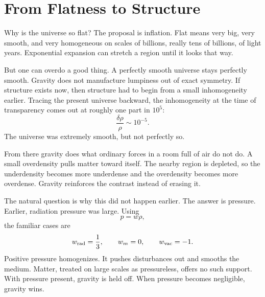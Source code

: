 \begin{classroomqa}
\end{classroomqa}

\begin{classroomqa}
\end{classroomqa}

\section{From Flatness to Structure}

Why is the universe so flat? The proposal is inflation. Flat means very big, very smooth, and very homogeneous on scales of billions, really tens of billions, of light years. Exponential expansion can stretch a region until it looks that way.

But one can overdo a good thing. A perfectly smooth universe stays perfectly smooth. Gravity does not manufacture lumpiness out of exact symmetry. If structure exists now, then structure had to begin from a small inhomogeneity earlier. Tracing the present universe backward, the inhomogeneity at the time of transparency comes out at roughly one part in \(10^5\):
\begin{equation}
\frac{\delta\rho}{\rho}\sim 10^{-5}.
\end{equation}
The universe was extremely smooth, but not perfectly so.

From there gravity does what ordinary forces in a room full of air do not do. A small overdensity pulls matter toward itself. The nearby region is depleted, so the underdensity becomes more underdense and the overdensity becomes more overdense. Gravity reinforces the contrast instead of erasing it.

The natural question is why this did not happen earlier. The answer is pressure. Earlier, radiation pressure was large. Using
\begin{equation}
p=w\rho,
\end{equation}
the familiar cases are
\begin{equation}
w_{\rm rad}=\frac13,\qquad
w_m=0,\qquad
w_{\rm vac}=-1.
\end{equation}
Positive pressure homogenizes. It pushes disturbances out and smooths the medium. Matter, treated on large scales as pressureless, offers no such support. With pressure present, gravity is held off. When pressure becomes negligible, gravity wins.

